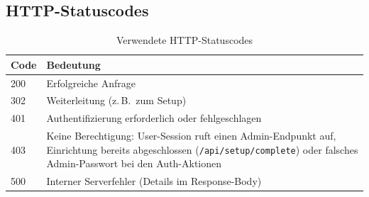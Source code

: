 \subsection{HTTP-Statuscodes}

\begin{table}[h]
\centering
\begin{tabular}{|l|p{9cm}|}
\hline
\textbf{Code} & \textbf{Bedeutung} \\
\hline
200 & Erfolgreiche Anfrage \\
302 & Weiterleitung (z.\,B.\ zum Setup) \\
401 & Authentifizierung erforderlich oder fehlgeschlagen \\
403 & Keine Berechtigung: User-Session ruft einen Admin-Endpunkt auf, Einrichtung bereits
  abgeschlossen (\texttt{/api/setup/complete}) oder falsches Admin-Passwort bei den
  Auth-Aktionen \\
500 & Interner Serverfehler (Details im Response-Body) \\
\hline
\end{tabular}
\caption{Verwendete HTTP-Statuscodes}
\end{table}
